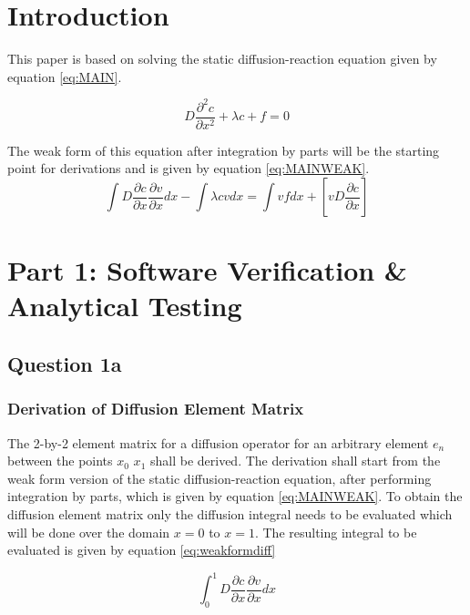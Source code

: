 \documentclass[11pt]{article}
\begin{document}


\clearpage
{}
\section{Introduction}

This paper is based on solving the static diffusion-reaction equation given by equation \ref{eq:MAIN}.


\begin{equation}\label{eq:MAIN}
D \frac{\partial^2 c}{\partial x^2} + \lambda c + f = 0
\end{equation}

The weak form of this equation after integration by parts will be the starting point for derivations and is given by equation \ref{eq:MAINWEAK}.
\begin{equation} \label{eq:MAINWEAK}
\int D \frac{\partial c}{\partial x}  \frac{\partial v}{\partial x}  dx - \int \lambda cvdx  = \int vf dx + \left[vD\frac{\partial c}{\partial x} \right]
\end{equation}


\section{Part 1: Software Verification \& Analytical Testing}

\subsection{Question 1a}
\subsubsection{Derivation of Diffusion Element Matrix}

The 2-by-2 element matrix for a diffusion operator for an arbitrary element $e_{n}$ between the points $x_{0}$ $x_{1}$ shall be derived.  The derivation shall start from the weak form version of the static diffusion-reaction equation, after performing integration by parts, which is given by equation \ref{eq:MAINWEAK}.  To obtain the diffusion element matrix only the diffusion integral needs to be evaluated which will be done over the domain $x = 0$ to $x = 1$. The resulting integral to be evaluated is given by equation \ref{eq:weakformdiff}

\begin{equation} \label{eq:weakformdiff}
\int_0^1 D \frac{\partial c}{\partial x}  \frac{\partial v}{\partial x}  dx 
\end{equation}
\end{document}
